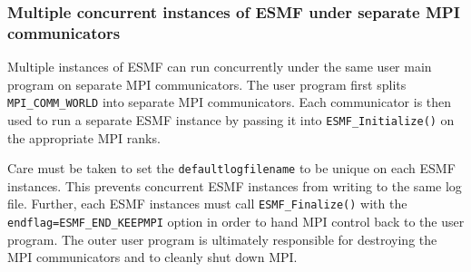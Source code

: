 
\setlength{\oldparskip}{\parskip}
\setlength{\parskip}{1.5ex}
\setlength{\oldparindent}{\parindent}
\setlength{\parindent}{0pt}
\setlength{\oldbaselineskip}{\baselineskip}
\setlength{\baselineskip}{11pt}
 
\def\bv{\begin{verbatim}}
\def\ev{\end{verbatim}}
\def\be{\begin{equation}}
\def\ee{\end{equation}}
\def\bea{\begin{eqnarray}}
\def\eea{\end{eqnarray}}
\def\bi{\begin{itemize}}
\def\ei{\end{itemize}}
\def\bn{\begin{enumerate}}
\def\en{\end{enumerate}}
\def\bd{\begin{description}}
\def\ed{\end{description}}
\def\({\left (}
\def\){\right )}
\def\[{\left [}
\def\]{\right ]}
\def\<{\left  \langle}
\def\>{\right \rangle}
\def\cI{{\cal I}}
\def\diag{\mathop{\rm diag}}
\def\tr{\mathop{\rm tr}}


 

  
   \subsubsection{Multiple concurrent instances of ESMF under separate MPI communicators}
   \label{vm_multi_instance_esmf}
  
   \begin{sloppypar}
   Multiple instances of ESMF can run concurrently under the same user main 
   program on separate MPI communicators. The user program first splits
   {\tt MPI\_COMM\_WORLD} into separate MPI communicators. Each communicator is
   then used to run a separate ESMF instance by passing it into 
   {\tt ESMF\_Initialize()} on the appropriate MPI ranks.
  
   Care must be taken to set the {\tt defaultlogfilename} to be unique on each
   ESMF instances. This prevents concurrent ESMF instances from writing to the
   same log file. 
   Further, each ESMF instances must call 
   {\tt ESMF\_Finalize()} with the {\tt endflag=ESMF\_END\_KEEPMPI} option in
   order to hand MPI control back to the user program. The outer user program is
   ultimately responsible for destroying the MPI communicators and to cleanly
   shut down MPI. 
   \end{sloppypar}
   
